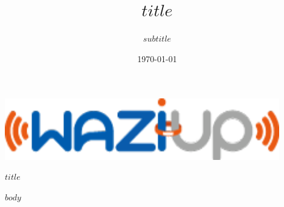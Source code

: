 \documentclass[$if(fontsize)$$fontsize$,$endif$$if(lang)$$babel-lang$,$endif$$if(papersize)$$papersize$paper,$endif$$for(classoption)$$classoption$$sep$,$endfor$]{$documentclass$}
\title{$title$}
\subtitle{$subtitle$}
\begin{document}
\begin{titlepage}
\begin{center}


\includegraphics[width=12cm]{static/images/logo-waziup.png}

\vspace{7cm}
\textsc{\Huge $title$}
 
\vspace{2cm}
\date{\today}

\end{center}
\end{titlepage}

\hypersetup{linkcolor=$if(toccolor)$$toccolor$$else$black$endif$}
\setcounter{tocdepth}{$toc-depth$}
\tableofcontents
\newpage

$body$
\end{document}
